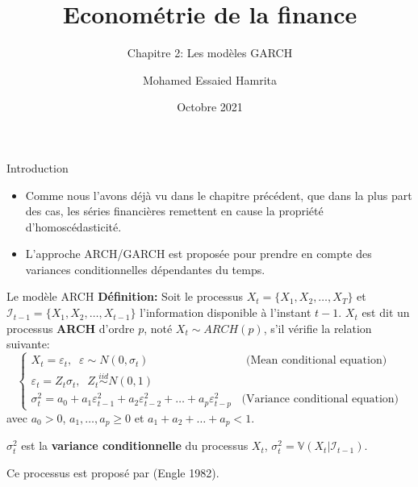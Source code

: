 \documentclass[
  ignorenonframetext,
]{beamer}
\title{Econométrie de la finance}
\subtitle{Chapitre 2: Les modèles GARCH}
\author{Mohamed Essaied Hamrita}
\date{Octobre 2021}
\begin{document}
\frame{\titlepage}

\begin{frame}
\end{frame}

\begin{frame}{Introduction}
\protect\hypertarget{introduction}{}
\begin{itemize}[<+->]
\item
  Comme nous l'avons déjà vu dans le chapitre précédent, que dans la
  plus part des cas, les séries financières remettent en cause la
  propriété d'homoscédasticité.
\item
  L'approche ARCH/GARCH est proposée pour prendre en compte des
  variances conditionnelles dépendantes du temps.
\end{itemize}
\end{frame}

\begin{frame}{Le modèle ARCH}
\protect\hypertarget{le-moduxe8le-arch}{}
\textbf{Définition:} Soit le processus \(X_t=\{X_1, X_2, \ldots, X_T\}\)
et \(\mathcal{I}_{t-1}=\{X_1, X_2, \ldots, X_{t-1}\}\) l'information
disponible à l'instant \(t-1\). \(X_t\) est dit un processus
\textbf{ARCH} d'ordre \(p\), noté \(X_t \sim ARCH(p)\), s'il vérifie la
relation suivante: \[
\begin{cases}
X_t=\varepsilon_t, \;\; \varepsilon \sim N(0,\sigma_t)\;\;\qquad\qquad\qquad\quad\;\:\: \text{ (Mean conditional equation)}\\
\varepsilon_t=Z_t\sigma_t,\;\; Z_t \stackrel{iid}\sim N(0,1)\\
\sigma^2_t=a_0 + a_1 \varepsilon^2_{t-1}+a_2 \varepsilon^2_{t-2} + \ldots +a_p \varepsilon^2_{t-p}\;\;\text{ (Variance conditional equation)}
\end{cases}
\] avec \(a_0 >0\), \(a_1,\ldots, a_p \geq 0\) et
\(a_1+a_2+\ldots + a_p<1\).

\(\sigma^2_t\) est la \textbf{variance conditionnelle} du processus
\(X_t\), \(\sigma^2_t=\mathbb{V}\left(X_t|\mathcal{I}_{t-1}\right)\).

Ce processus est proposé par (Engle 1982).
\end{frame}
\end{document}
